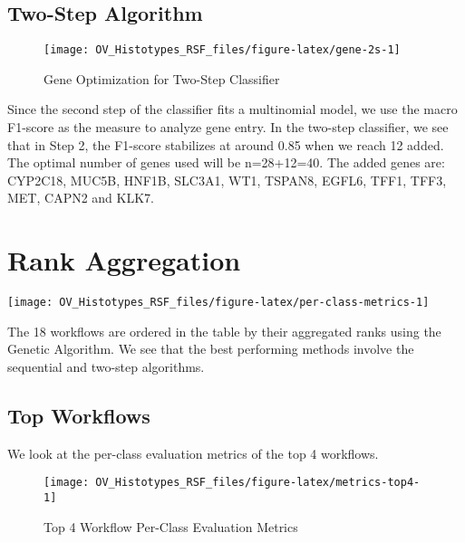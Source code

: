 \documentclass[
]{report}
\begin{document}
\hypertarget{two-step-algorithm-1}{%
\subsection{Two-Step Algorithm}\label{two-step-algorithm-1}}

\begin{figure}[H]

{\centering \texttt{[image: OV\_Histotypes\_RSF\_files/figure-latex/gene-2s-1]} 

}

\caption{Gene Optimization for Two-Step Classifier}\label{fig:gene-2s}
\end{figure}

Since the second step of the classifier fits a multinomial model, we use the macro F1-score as the measure to analyze gene entry. In the two-step classifier, we see that in Step 2, the F1-score stabilizes at around 0.85 when we reach 12 added. The optimal number of genes used will be n=28+12=40. The added genes are: CYP2C18, MUC5B, HNF1B, SLC3A1, WT1, TSPAN8, EGFL6, TFF1, TFF3, MET, CAPN2 and KLK7.

\hypertarget{rank-aggregation}{%
\section{Rank Aggregation}\label{rank-aggregation}}

\begin{center}\texttt{[image: OV\_Histotypes\_RSF\_files/figure-latex/per-class-metrics-1]} \end{center}

The 18 workflows are ordered in the table by their aggregated ranks using the Genetic Algorithm. We see that the best performing methods involve the sequential and two-step algorithms.

\hypertarget{top-workflows}{%
\subsection{Top Workflows}\label{top-workflows}}

We look at the per-class evaluation metrics of the top 4 workflows.

\begin{figure}[H]

{\centering \texttt{[image: OV\_Histotypes\_RSF\_files/figure-latex/metrics-top4-1]} 

}

\caption{Top 4 Workflow Per-Class Evaluation Metrics}\label{fig:metrics-top4}
\end{figure}
\end{document}

